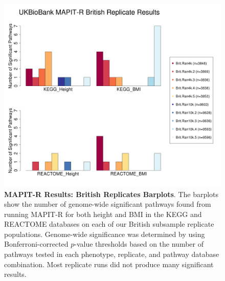 \documentclass[12pt, a4paper]{article}
\begin{document}
\begin{figure}[htbp]
\centering
\includegraphics[scale=.45]{Images/Supp/InterPath_Supp_Figure_BritReps_Barplot_vs2.png}
\caption[TBD]{\textbf{MAPIT-R Results: British Replicates Barplots}. The barplots show the number of genome-wide significant pathways found from running MAPIT-R for both height and BMI in the KEGG and REACTOME databases on each of our British subsample replicate populations. Genome-wide significance was determined by using Bonferroni-corrected $p$-value thresholds based on the number of pathways tested in each phenotype, replicate, and pathway database combination. Most replicate runs did not produce many significant results.}
\label{InterPath-Supp-Figure-BritReps-Barplots}
\end{figure}
\clearpage
\end{document}

